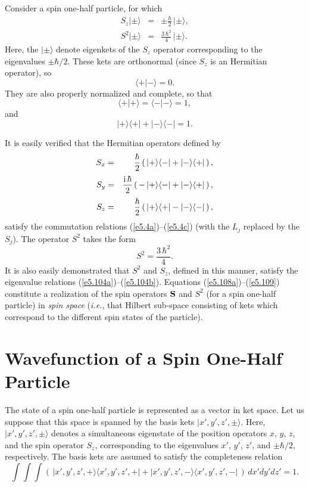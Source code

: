 Consider a spin one-half particle, for which
\begin{eqnarray}\label{e5.104a}
S_z |\pm \rangle &=&\pm \frac{\hbar}{2} \,|\pm \rangle,\\[0.5ex]
S^2 |\pm\rangle &=& \frac{3 \,\hbar^2}{4}\,|\pm \rangle.\label{e5.104b}
\end{eqnarray}
Here, the $|\pm \rangle$ denote eigenkets of the $S_z$ operator corresponding to
the eigenvalues $\pm \hbar/2$. These kets are orthonormal (since $S_z$ is
an Hermitian operator), so
\begin{equation}
\langle +| -\rangle = 0.
\end{equation}
They  are also properly normalized and complete, so that
\begin{equation}
\langle +| + \rangle=\langle -| - \rangle = 1,
\end{equation}
and
\begin{equation}
|+\rangle \langle +| + |-\rangle \langle -| = 1.
\end{equation}

It is easily verified that the Hermitian operators defined by
\begin{eqnarray}\label{e5.108a}
S_x &= &\frac{\hbar}{2} \left(\, |+\rangle \langle -| + |-\rangle \langle +|\,
\right),
\\[0.5ex]
S_y &=& \frac{{\rm i}\,\hbar}{2}\left(\, -\,|+\rangle \langle -| +
 |-\rangle \langle +|\,\right),
\\[0.5ex]
S_z &=& \frac{\hbar}{2}\left(\, |+\rangle \langle +| - |-\rangle \langle -|\,\right),\label{e5.108c}
\end{eqnarray}
satisfy the commutation relations (\ref{e5.4a})--(\ref{e5.4c}) (with the $L_j$ replaced by the $S_j$).
The operator $S^2$ takes the form 
\begin{equation}\label{e5.109}
S^2 = \frac{3\,\hbar^2}{4}.
\end{equation}
It is also easily demonstrated that $S^2$ and $S_z$,
defined in this manner,  satisfy the eigenvalue
relations (\ref{e5.104a})--(\ref{e5.104b}). Equations (\ref{e5.108a})--(\ref{e5.109}) constitute a realization
of the spin operators ${\bf S}$ and $S^2$ (for a spin one-half particle)
in {\em spin space} ({\em i.e.}, that Hilbert sub-space consisting of kets which
correspond to the different spin states of the particle). 

\section{Wavefunction of a Spin One-Half Particle}\label{s5.8}
The state of a spin one-half particle is represented as a vector in ket space.
Let us suppose that this space is spanned by the basis kets
$|x', y', z', \pm\rangle$. Here, $|x',y',z', \pm\rangle$ denotes a
simultaneous eigenstate of the position operators $x$, $y$, $z$, and
the spin operator $S_z$, corresponding to the eigenvalues $x'$, $y'$, $z'$,
and $\pm \hbar/2$, respectively. The basis kets are assumed to
satisfy the completeness relation
\begin{equation}
\int\!\int\!\int \left(\,
|x',y',z',+\rangle\langle x', y', z',+|+|x',y',z',-\rangle\langle x', y', z',-|
\,\right) \,dx'dy'dz' = 1.
\end{equation}

